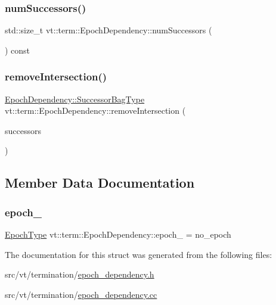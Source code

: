 \subsubsection{\texorpdfstring{num\+Successors()}{numSuccessors()}}
{\footnotesize\ttfamily std\+::size\+\_\+t vt\+::term\+::\+Epoch\+Dependency\+::num\+Successors (\begin{DoxyParamCaption}{ }\end{DoxyParamCaption}) const}

\mbox{\label{structvt_1_1term_1_1_epoch_dependency_af954a09153989157f1b48a2df32a26b8}} 
\subsubsection{\texorpdfstring{remove\+Intersection()}{removeIntersection()}}
{\footnotesize\ttfamily \hyperlink{structvt_1_1term_1_1_epoch_dependency_a3f00b47c33158f3241ebbeb0a0cb7b1d}{Epoch\+Dependency\+::\+Successor\+Bag\+Type} vt\+::term\+::\+Epoch\+Dependency\+::remove\+Intersection (\begin{DoxyParamCaption}\item[{\hyperlink{structvt_1_1term_1_1_epoch_dependency_a3f00b47c33158f3241ebbeb0a0cb7b1d}{Successor\+Bag\+Type}}]{successors }\end{DoxyParamCaption})}



\subsection{Member Data Documentation}
\mbox{\label{structvt_1_1term_1_1_epoch_dependency_a7b73a74a4359d3ca4b60ee859265850b}} 
\subsubsection{\texorpdfstring{epoch\+\_\+}{epoch\_}}
{\footnotesize\ttfamily \hyperlink{namespacevt_a985a5adf291c34a3ca263b3378388236}{Epoch\+Type} vt\+::term\+::\+Epoch\+Dependency\+::epoch\+\_\+ = no\+\_\+epoch\hspace{0.3cm}{\ttfamily [protected]}}



The documentation for this struct was generated from the following files\+:\begin{DoxyCompactItemize}
\item 
src/vt/termination/\hyperlink{epoch__dependency_8h}{epoch\+\_\+dependency.\+h}\item 
src/vt/termination/\hyperlink{epoch__dependency_8cc}{epoch\+\_\+dependency.\+cc}\end{DoxyCompactItemize}
